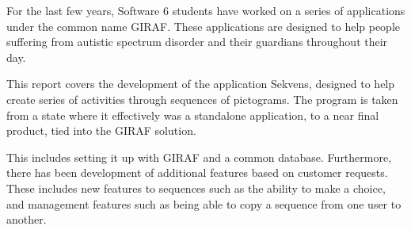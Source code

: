 For the last few years, Software 6 students have worked on a series of applications under the common name GIRAF. These applications are designed to help people suffering from autistic spectrum disorder and their guardians throughout their day.

 This report covers the development of the application Sekvens, designed to help create series of activities through sequences of pictograms. The program is taken from a state where it effectively was a standalone application, to a near final product, tied into the GIRAF solution.
 
 This includes setting it up with GIRAF and a common database. Furthermore, there has been development of additional features based on customer requests. These includes new features to sequences such as the ability to make a choice, and management features such as being able to copy a sequence from one user to another.